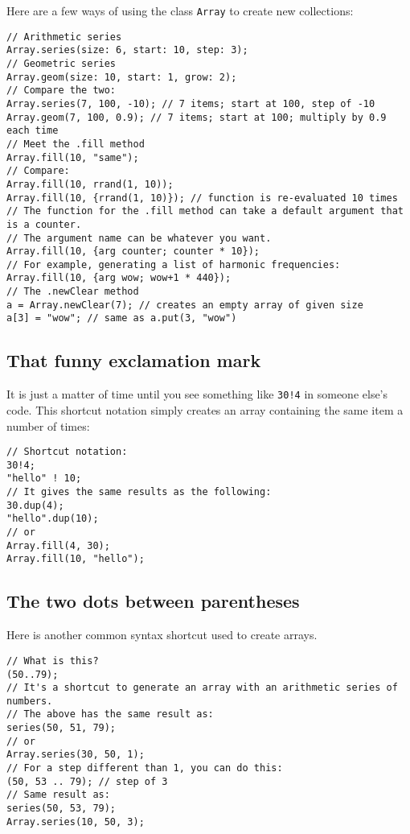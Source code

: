 Here are a few ways of using the class \texttt{Array} to create new collections:

\begin{lstlisting}[style=SuperCollider-IDE, basicstyle=\scttfamily\footnotesize]
// Arithmetic series
Array.series(size: 6, start: 10, step: 3);
// Geometric series
Array.geom(size: 10, start: 1, grow: 2);
// Compare the two:
Array.series(7, 100, -10); // 7 items; start at 100, step of -10
Array.geom(7, 100, 0.9); // 7 items; start at 100; multiply by 0.9 each time
// Meet the .fill method
Array.fill(10, "same");
// Compare:
Array.fill(10, rrand(1, 10)); 
Array.fill(10, {rrand(1, 10)}); // function is re-evaluated 10 times
// The function for the .fill method can take a default argument that is a counter.
// The argument name can be whatever you want.
Array.fill(10, {arg counter; counter * 10});
// For example, generating a list of harmonic frequencies:
Array.fill(10, {arg wow; wow+1 * 440}); 
// The .newClear method
a = Array.newClear(7); // creates an empty array of given size
a[3] = "wow"; // same as a.put(3, "wow")
\end{lstlisting}


\subsection{That funny exclamation mark}

It is just a matter of time until you see something like \texttt{30!4} in someone else's code. This shortcut notation simply creates an array containing the same item a number of times:

 
\begin{lstlisting}[style=SuperCollider-IDE, basicstyle=\scttfamily\footnotesize]
// Shortcut notation:
30!4;
"hello" ! 10;
// It gives the same results as the following:
30.dup(4);
"hello".dup(10);
// or
Array.fill(4, 30);
Array.fill(10, "hello");
\end{lstlisting}
 

\subsection{The two dots between parentheses}

Here is another common syntax shortcut used to create arrays.

 
\begin{lstlisting}[style=SuperCollider-IDE, basicstyle=\scttfamily\footnotesize]
// What is this?
(50..79);
// It's a shortcut to generate an array with an arithmetic series of numbers.
// The above has the same result as:
series(50, 51, 79);
// or
Array.series(30, 50, 1);
// For a step different than 1, you can do this:
(50, 53 .. 79); // step of 3
// Same result as:
series(50, 53, 79);
Array.series(10, 50, 3);
\end{lstlisting}
 

